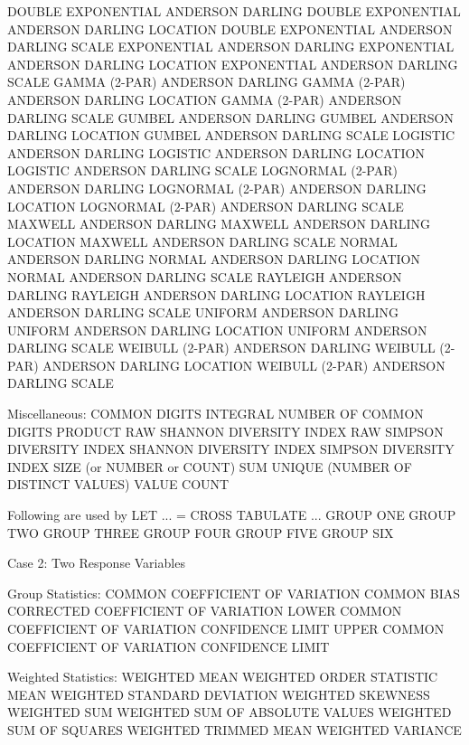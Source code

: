    DOUBLE EXPONENTIAL ANDERSON DARLING
   DOUBLE EXPONENTIAL ANDERSON DARLING LOCATION
   DOUBLE EXPONENTIAL ANDERSON DARLING SCALE
   EXPONENTIAL        ANDERSON DARLING
   EXPONENTIAL        ANDERSON DARLING LOCATION
   EXPONENTIAL        ANDERSON DARLING SCALE
   GAMMA (2-PAR)      ANDERSON DARLING
   GAMMA (2-PAR)      ANDERSON DARLING LOCATION
   GAMMA (2-PAR)      ANDERSON DARLING SCALE
   GUMBEL             ANDERSON DARLING
   GUMBEL             ANDERSON DARLING LOCATION
   GUMBEL             ANDERSON DARLING SCALE
   LOGISTIC           ANDERSON DARLING
   LOGISTIC           ANDERSON DARLING LOCATION
   LOGISTIC           ANDERSON DARLING SCALE
   LOGNORMAL (2-PAR)  ANDERSON DARLING
   LOGNORMAL (2-PAR)  ANDERSON DARLING LOCATION
   LOGNORMAL (2-PAR)  ANDERSON DARLING SCALE
   MAXWELL            ANDERSON DARLING
   MAXWELL            ANDERSON DARLING LOCATION
   MAXWELL            ANDERSON DARLING SCALE
   NORMAL             ANDERSON DARLING
   NORMAL             ANDERSON DARLING LOCATION
   NORMAL             ANDERSON DARLING SCALE
   RAYLEIGH           ANDERSON DARLING
   RAYLEIGH           ANDERSON DARLING LOCATION
   RAYLEIGH           ANDERSON DARLING SCALE
   UNIFORM            ANDERSON DARLING
   UNIFORM            ANDERSON DARLING LOCATION
   UNIFORM            ANDERSON DARLING SCALE
   WEIBULL (2-PAR)    ANDERSON DARLING
   WEIBULL (2-PAR)    ANDERSON DARLING LOCATION
   WEIBULL (2-PAR)    ANDERSON DARLING SCALE

Miscellaneous:
   COMMON DIGITS
   INTEGRAL
   NUMBER OF COMMON DIGITS
   PRODUCT
   RAW SHANNON DIVERSITY INDEX
   RAW SIMPSON DIVERSITY INDEX
   SHANNON DIVERSITY INDEX
   SIMPSON DIVERSITY INDEX
   SIZE (or NUMBER or COUNT)
   SUM
   UNIQUE (NUMBER OF DISTINCT VALUES)
   VALUE COUNT

Following are used by  LET ... = CROSS TABULATE ...
   GROUP ONE
   GROUP TWO
   GROUP THREE
   GROUP FOUR
   GROUP FIVE
   GROUP SIX

Case 2: Two Response Variables

Group Statistics:
   COMMON COEFFICIENT OF VARIATION
   COMMON BIAS CORRECTED COEFFICIENT OF VARIATION
   LOWER COMMON COEFFICIENT OF VARIATION CONFIDENCE LIMIT
   UPPER COMMON COEFFICIENT OF VARIATION CONFIDENCE LIMIT

Weighted Statistics:
   WEIGHTED MEAN
   WEIGHTED ORDER STATISTIC MEAN
   WEIGHTED STANDARD DEVIATION
   WEIGHTED SKEWNESS
   WEIGHTED SUM
   WEIGHTED SUM OF ABSOLUTE VALUES
   WEIGHTED SUM OF SQUARES
   WEIGHTED TRIMMED MEAN
   WEIGHTED VARIANCE

